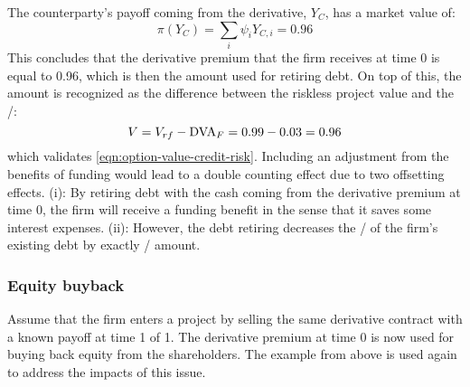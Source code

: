\documentclass[../main.tex]{subfiles}
\begin{document}
            The counterparty's payoff coming from the derivative, $Y_C$, has a market value of:
            \begin{equation}
                \pi(Y_{C}) = \sum_i \psi_i Y_{C,i} = 0.96
            \end{equation}
            This concludes that the derivative premium that the firm receives at time 0 is equal to 0.96, 
            which is then the amount used for retiring debt. 
            On top of this, the amount is recognized as the difference between the riskless project value and the \DVA/:
            \begin{equation}
                V = V_{rf} - \DVA/_F = 0.99 - 0.03 = 0.96
            \end{equation}
            which validates \cref{eqn:option-value-credit-risk}. 
            Including an adjustment from the benefits of funding 
            would lead to a double counting effect due to two offsetting effects. 
            (i): By retiring debt with the cash coming from the derivative premium at time 0, 
            the firm will receive a funding benefit in the sense that it saves some interest expenses. 
            (ii): However, the debt retiring decreases the \DVA/ of the firm's existing debt 
            by exactly \FBA/ amount.

        \subsubsection{Equity buyback}
            Assume that the firm enters a project 
            by selling the same derivative contract with a known payoff at time 1 of 1. 
            The derivative premium at time 0 is now used for buying back equity from the shareholders. 
            The example from above is used again to address the impacts of this issue.
\end{document}
